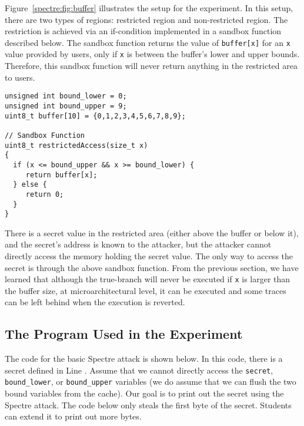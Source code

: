 Figure~\ref{spectre:fig:buffer} illustrates the setup for the experiment.
In this setup, there are two types of regions: restricted region and non-restricted region.
The restriction is achieved via an if-condition implemented in a sandbox function
described below. The sandbox function returns the value of \texttt{buffer[x]} for an \texttt{x}
value provided by users, only if \texttt{x} is between the buffer's
lower and upper bounds.
Therefore, this sandbox function
will never return anything in the restricted area to users.


\begin{lstlisting}
unsigned int bound_lower = 0;
unsigned int bound_upper = 9;
uint8_t buffer[10] = {0,1,2,3,4,5,6,7,8,9};

// Sandbox Function
uint8_t restrictedAccess(size_t x)
{
  if (x <= bound_upper && x >= bound_lower) {
     return buffer[x];
  } else {
     return 0;
  }
}
\end{lstlisting}

There is a secret value in the restricted area (either above the buffer
or below it), and the secret's address is known to the attacker, but
the attacker cannot directly access the memory holding the secret value.
The only way to access the
secret is through the above sandbox function. From the previous section, we have learned that
although the true-branch will never be executed if \texttt{x} is larger than the buffer size,
at microarchitectural level, it can be executed and some traces can be left behind
when the execution is reverted.


\subsection{The Program Used in the Experiment}


The code for the basic Spectre attack is shown below. In this code, there is a
secret defined in Line . Assume that we cannot directly
access the \texttt{secret}, \texttt{bound\_lower}, or 
\texttt{bound\_upper} variables (we do assume that we
can flush the two bound variables from the cache). 
Our goal is to print out the secret
using the Spectre attack. The code below only steals the first byte of the secret. Students can
extend it to print out more bytes. 


